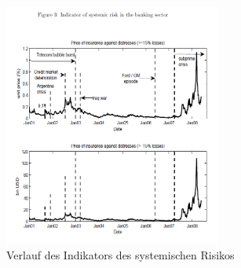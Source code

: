 \documentclass[a4paper,12pt]{scrartcl}
\begin{document}
\begin{figure}[htb]
	\centering
		\includegraphics[height=8cm]{Pictures/Figure3.png}
		\caption{Verlauf des Indikators des systemischen Risikos}
\end{figure}


\newpage


\end{document}
